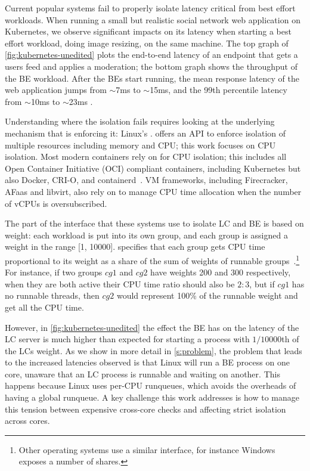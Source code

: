Current popular systems fail to properly isolate latency critical from best
effort workloads. When running a small but realistic social network web
application on Kubernetes, we observe significant impacts on its latency when
starting a best effort workload, doing image resizing, on the same machine. The
top graph of \autoref{fig:kubernetes-unedited} plots the end-to-end latency of
an endpoint that gets a users feed and applies a moderation; the bottom graph
shows the throughput of the BE workload. After the BEs start running, the mean
response latency of the web application jumps from $\sim$7ms to $\sim$15ms, and
the 99th percentile latency from $\sim$10ms to $\sim$23ms . 

Understanding where the isolation fails requires looking at the underlying
mechanism that is enforcing it: Linux's \cgroups{}. \cgroups{} offers an API to
enforce isolation of multiple resources including memory and CPU; this work
focuses on CPU isolation. Most modern containers rely on \cgroups{} for CPU
isolation; this includes all Open Container Initiative (OCI) compliant
containers, including Kubernetes but also Docker, CRI-O, and
containerd~\cite{oci-cgroups,docker-docs-cgroups,container-isolation-article}.
VM frameworks, including Firecracker, AFaas and libvirt, also rely on \cgroups{}
to manage CPU time allocation when the number of vCPUs is
oversubscribed.~\cite{firecracker-cgroups,afaas,libvirt-cgroups}

The part of the \cgroups{} interface that these systems use to isolate LC and BE
is based on weight: each workload is put into its own group, and each group is
assigned a weight in the range [1, 10000]. \cgroups{} specifies that each group
gets CPU time proportional to its weight as a share of the sum of weights of
runnable groups~\cite{cgroups-kerneldocs}.\footnote{Other operating systems use
a similar interface, for instance Windows exposes a number of shares.} For
instance, if two groups $cg1$ and $cg2$ have weights 200 and 300 respectively,
when they are both active their CPU time ratio should also be $2:3$, but if
$cg1$ has no runnable threads, then $cg2$ would represent 100\% of the runnable
weight and get all the CPU time.

However, in \autoref{fig:kubernetes-unedited} the effect the BE has on the
latency of the LC server is much higher than expected for starting a process
with $1/10000$th of the LCs weight. As we show in more detail in
\autoref{s:problem}, the problem that leads to the increased latencies observed
is that Linux will run a BE process on one core, unaware that an LC process is
runnable and waiting on another. This happens because Linux uses per-CPU
runqueues, which avoids the overheads of having a global runqueue. A key
challenge this work addresses is how to manage this tension between expensive
cross-core checks and affecting strict isolation across cores.


